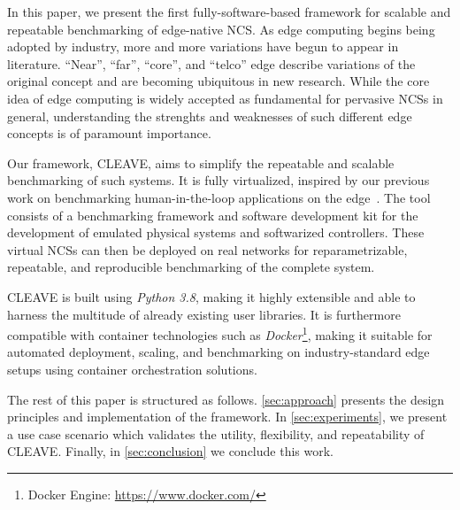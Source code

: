 In this paper, we present the first fully-software-based framework for scalable and repeatable benchmarking of edge-native \ac{NCS}.
As edge computing begins being adopted by industry, more and more variations have begun to appear in literature.
``Near'', ``far'', ``core'', and ``telco'' edge describe variations of the original concept and are becoming ubiquitous in new research.
While the core idea of edge computing is widely accepted as fundamental for pervasive \acp{NCS} in general, understanding the strenghts and weaknesses of such different edge concepts is of paramount importance.

Our framework, \ac{CLEAVE}, aims to simplify the repeatable and scalable benchmarking of such systems.
It is fully virtualized, inspired by our previous work on benchmarking human-in-the-loop applications on the edge~\cite{Olguin2019EdgeDroid}.
The tool consists of a benchmarking framework and software development kit for the development of emulated physical systems and softwarized controllers.
These virtual \acp{NCS} can then be deployed on real networks for reparametrizable, repeatable, and reproducible benchmarking of the complete system.

\ac{CLEAVE} is built using \emph{Python 3.8}, making it highly extensible and able to harness the multitude of already existing user libraries.
It is furthermore compatible with container technologies such as \emph{Docker}\footnote{Docker Engine: \url{https://www.docker.com/}}, making it suitable for automated deployment, scaling, and benchmarking on industry-standard edge setups using container orchestration solutions.

The rest of this paper is structured as follows.
\cref{sec:approach} presents the design principles and implementation of the framework.
In \cref{sec:experiments}, we present a use case scenario which validates the utility, flexibility, and repeatability of \ac{CLEAVE}.
Finally, in \cref{sec:conclusion} we conclude this work.